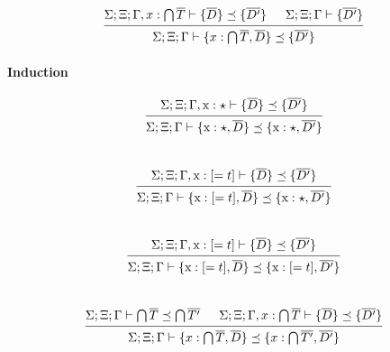 \documentclass[12pt]{article}
\newcommand{\tx}{\text{\rm x}}
\newcommand{\Gammatop}{\ensuremath{\Xi}}
\newcommand{\Gammabot}{\ensuremath{\Gamma}}
\begin{document}
\[
    \begin{prooftree}
        \hypo{ \Sigma; \Gammatop; \Gammabot, x : \bigcap \overline{T} \vdash \{ \overline{D} \} \preceq \{\overline{D'}\} }
        \hypo{ \Sigma; \Gammatop; \Gammabot  \vdash \{\overline{D'}\}}
        \infer2{ \Sigma; \Gammatop; \Gammabot \vdash \{ x : \bigcap \overline{T}, \overline{D} \} \preceq \{ \overline{D'} \} }
    \end{prooftree}
\]

\paragraph{Induction}

\[
    \begin{prooftree}
        \hypo{ \Sigma; \Gammatop; \Gammabot, \tx : \star \vdash \{\overline{D}\} \preceq \{\overline{D'}\} }
        \infer1{ \Sigma; \Gammatop; \Gammabot \vdash \{ \tx : \star, \overline{D} \} \preceq \{ \tx : \star, \overline{D'} \} }
    \end{prooftree}
\] \\

\[
    \begin{prooftree}
        \hypo{ \Sigma; \Gammatop; \Gammabot, \tx : [= t] \vdash \{\overline{D}\} \preceq \{\overline{D'} \} }
        \infer1{ \Sigma; \Gammatop; \Gammabot \vdash \{ \tx : [= t], \overline{D} \} \preceq \{ \tx : \star, \overline{D'} \} }
    \end{prooftree}
\] \\

\[
    \begin{prooftree}
        \hypo{ \Sigma; \Gammatop; \Gammabot, \tx : [= t] \vdash \{\overline{D}\} \preceq \{\overline{D'}\} }
        \infer1{ \Sigma; \Gammatop; \Gammabot \vdash \{ \tx : [= t], \overline{D} \} \preceq \{ \tx : [= t], \overline{D'} \} }
    \end{prooftree}
\] \\

\[
    \begin{prooftree}
        \hypo{ \Sigma; \Gammatop; \Gammabot \vdash \bigcap \overline{T} \preceq \bigcap \overline{T'} }
        \hypo{ \Sigma; \Gammatop; \Gammabot, x : \bigcap \overline{T} \vdash \{\overline{D}\} \preceq \{\overline{D'}\} }
        \infer2{ \Sigma; \Gammatop; \Gammabot \vdash \{ x: \bigcap \overline{T}, \overline{D} \} \preceq \{ x: \bigcap \overline{T'}, \overline{D'} \} }
    \end{prooftree}
\] \\
\end{document}

